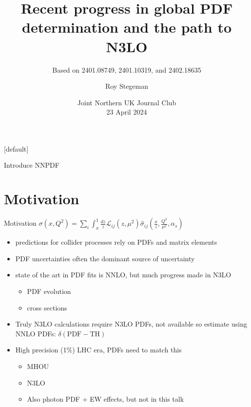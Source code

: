 \documentclass[aspectratio=169, 9pt,t]{beamer}
\title{Recent progress in global PDF determination and the path to N3LO}
\subtitle{Based on 2401.08749, 2401.10319, and 2402.18635 }
\date{Joint Northern UK Journal Club  \\[0.1cm] 23 April 2024}
\author{Roy Stegeman}
\institute{\small The University of Edinburgh}
\begin{document}
{
\begin{frame}
  \titlepage
\end{frame}
}

[default]



\newcommand{\nn}{\vspace*{1em}}


\begin{frame}{Introduce NNPDF}
\end{frame}



\section*{Motivation}

\begin{frame}{Motivation}
  $\sigma(x,Q^2)=\sum_i \int_x^1 \frac{dz}{z} \mathcal{L}_{ij}(z,\mu^2)\hat{\sigma}_{ij}\left(\frac{x}{z},\frac{Q^2}{\mu^2},\alpha_s\right)$

  \begin{itemize}
    \item predictions for collider processes rely on PDFs and matrix elements
    \item PDF uncertainties often the dominant source of uncertainty
    \item state of the art in PDF fits is NNLO, but much progress made in N3LO
    \begin{itemize}
      \item PDF evolution
      \item cross sections
    \end{itemize}
    \item Truly N3LO calculations require N3LO PDFs, not available so estimate using NNLO PDFs: $\delta(\mathrm{PDF-TH})$
    \item High precision (1\%) LHC era, PDFs need to match this
    \begin{itemize}
      \item MHOU
      \item N3LO
      \item Also photon PDF + EW effects, but not in this talk
    \end{itemize}
  \end{itemize}
\end{frame}
\end{document}
